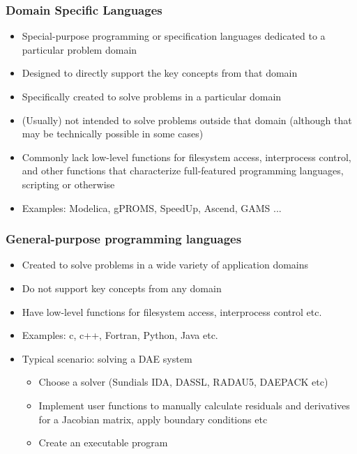 \documentclass[compress,newPxFont,sthlmFooter]{beamer}
\begin{document}
\begin{frame}
\frametitle{Domain Specific Languages}
\begin{block}{}
\begin{itemize}
  \item Special-purpose programming or specification languages dedicated to a particular problem domain
  \item Designed to directly support the key concepts from that domain
  \item Specifically created to solve problems in a particular domain
  \item (Usually) not intended to solve problems outside that domain (although that may be technically possible in some cases)
  \item Commonly lack low-level functions for filesystem access, interprocess control, and other functions that characterize 
	full-featured programming languages, scripting or otherwise
  \item Examples: Modelica, gPROMS, SpeedUp, Ascend, GAMS ...
\end{itemize}
\end{block}
\end{frame}

\begin{frame}
\frametitle{General-purpose programming languages}
\begin{block}{}
\begin{itemize}
  \item Created to solve problems in a wide variety of application domains
  \item Do not support key concepts from any domain
  \item Have low-level functions for filesystem access, interprocess control etc.
  \item Examples: c, c++, Fortran, Python, Java etc.
  \item Typical scenario: solving a DAE system
  \begin{itemize}
    \item Choose a solver (Sundials IDA, DASSL, RADAU5, DAEPACK etc)
    \item Implement user functions to manually calculate residuals and derivatives for a Jacobian matrix, apply boundary conditions etc
    \item Create an executable program
  \end{itemize}
\end{itemize}
\end{block}
\end{frame}
\end{document}
